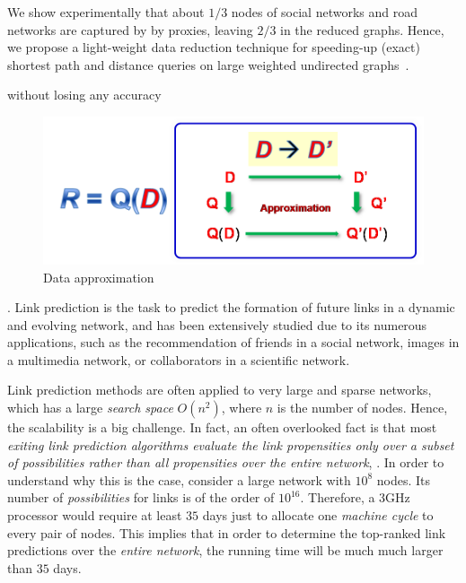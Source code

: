 We show experimentally that about $1/3$  nodes of social networks and road networks  are captured by by proxies, leaving $2/3$ in the reduced graphs.
Hence, we propose a light-weight data reduction technique for speeding-up (exact)  shortest path and distance queries on large weighted undirected graphs~\cite{MaFLWCH16}.


without losing any accuracy

\begin{figure}[tb!]
  \vspace{-1ex}
  \begin{center}
  \includegraphics[scale=0.45]{./dataApprox.png}
  \end{center}
  \vspace{-3ex}
  \caption{Data approximation}\label{fig-tech-dataappro}
  \vspace{-2ex}
\end{figure}

. Link prediction is the task to predict the formation of future links in a dynamic and evolving network, and has been extensively studied due to its numerous applications, such as the recommendation of friends in a social network, images in a multimedia network, or
collaborators in a scientific network.


Link prediction methods are often applied to very large and sparse networks, which has a large {\em search space} $O(n^2)$, 
where $n$ is the number of nodes. Hence, the scalability is a big challenge. In fact, an often overlooked fact is that most {\em exiting link prediction algorithms evaluate the link propensities only over a subset of possibilities rather than all propensities over the entire network}, \eg \cite{zhu2016}.
In order to understand why this is the case, consider a large network with $10^8$ nodes. Its number of {\em possibilities} for links
is of the order of $10^{16}$. Therefore, a 3GHz processor would
require at least $35$ days just to allocate one {\em machine cycle} to
every pair of nodes. This implies that in order to determine the
top-ranked link predictions over the {\em entire network}, the
running time will be much much larger than $35$ days.  

